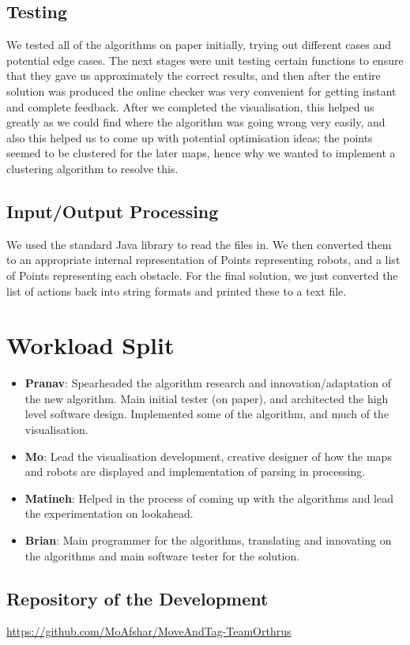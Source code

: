 \documentclass[12pt]{article}
\begin{document}
\subsection{Testing}
We tested all of the algorithms on paper initially, trying out different cases and potential edge cases. The next stages were unit testing certain functions to ensure that they gave us approximately the correct results, and then after the entire solution was produced the online checker was very convenient for getting instant and complete feedback. After we completed the visualisation, this helped us greatly as we could find where the algorithm was going wrong very easily, and also this helped us to come up with potential optimisation ideas; the points seemed to be clustered for the later maps, hence why we wanted to implement a clustering algorithm to resolve this. 

\subsection{Input/Output Processing}
We used the standard Java library to read the files in. We then converted them to an appropriate internal representation of Points representing robots, and a list of Points representing each obstacle. For the final solution, we just converted the list of actions back into string formats and printed these to a text file. 

\section{Workload Split}
\begin{itemize}
\item \textbf{Pranav}: Spearheaded the algorithm research and innovation/adaptation of the new algorithm. Main initial tester (on paper), and architected the high level software design. Implemented some of the algorithm, and much of the visualisation. 
\item \textbf{Mo}: Lead the visualisation development, creative designer of how the maps and robots are displayed and implementation of parsing in processing. 
\item \textbf{Matineh}: Helped in the process of coming up with the algorithms and lead the experimentation on lookahead. 
\item \textbf{Brian}: Main programmer for the algorithms, translating and innovating on the algorithms and main software tester for the solution. 
\end{itemize}
\subsection{Repository of the Development}
\url{https://github.com/MoAfshar/MoveAndTag-TeamOrthrus}
\end{document}
